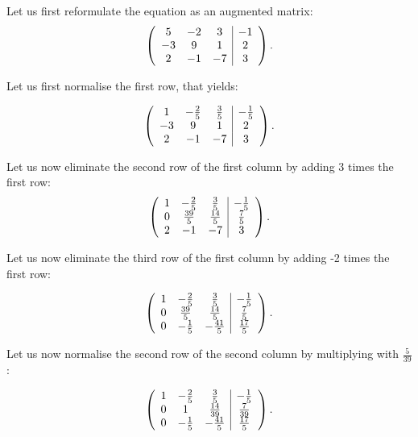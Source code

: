 \documentclass[10pt]{article}
\begin{document}
\begin{solution}[]  \label{sol:}
Let us first reformulate the equation as an augmented matrix:
\begin{align*}
\left( \begin{array}{c c c | c}
5  &  -2  &  3  &  -1 \\
-3  &  9  &  1  &  2 \\
2  &  -1  &  -7  &  3
\end{array} \right)
.
\end{align*}

Let us first normalise the first row, that yields:

\begin{align*}
\left( \begin{array}{c c c | c}
1  &  -\frac{2}{5}  &  \frac{3}{5}  &  -\frac{1}{5} \\
-3  &  9  &  1  &  2 \\
2  &  -1  &  -7  &  3
\end{array} \right)
.
\end{align*}

Let us now eliminate the second row of the first column by adding
3 times the first row:
\begin{align*}
\left( \begin{array}{c c c | c}
1  &  -\frac{2}{5}  &  \frac{3}{5}  &  -\frac{1}{5} \\
0  &  \frac{39}{5}  &  \frac{14}{5}  &  \frac{7}{5} \\
2  &  -1  &  -7  &  3
\end{array} \right)
.
\end{align*}

Let us now eliminate the third row of the first column by adding
-2 times the first row:

\begin{align*}
\left( \begin{array}{c c c | c}
1  &  -\frac{2}{5}  &  \frac{3}{5}  &  -\frac{1}{5} \\
0  &  \frac{39}{5}  &  \frac{14}{5}  &  \frac{7}{5} \\
0  &  -\frac{1}{5}  &  -\frac{41}{5}  &  \frac{17}{5}
\end{array} \right)
.
\end{align*}

Let us now normalise the second row of the second column by
multiplying with \(\frac{5}{39}\):

\begin{align*}
\left( \begin{array}{c c c | c}
1  &  -\frac{2}{5}  &  \frac{3}{5}  &  -\frac{1}{5} \\
0  &  1  &  \frac{14}{39}  &  \frac{7}{39} \\
0  &  -\frac{1}{5}  &  -\frac{41}{5}  &  \frac{17}{5}
\end{array} \right)
.
\end{align*}


\end{solution}
\end{document}
